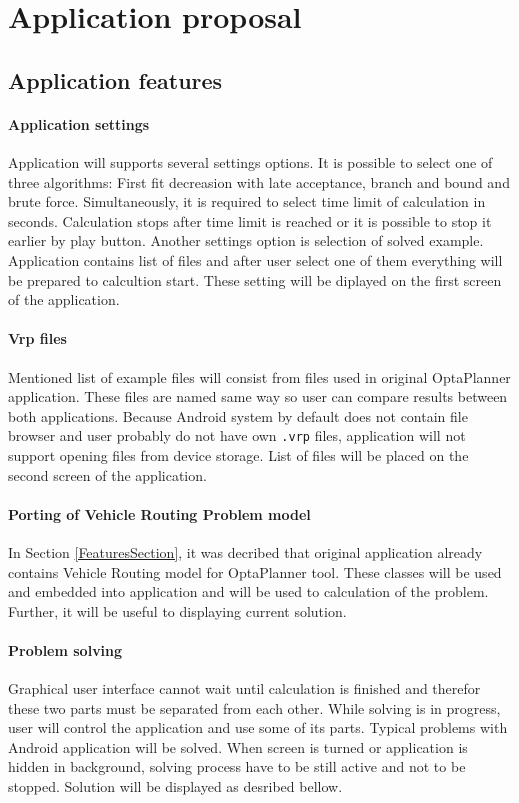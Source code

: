 \section{Application proposal}

\subsection{Application features}

\paragraph{Application settings}
Application will supports several settings options. It is possible to select one of three algorithms: First fit
decreasion with late acceptance, branch and bound and brute force. Simultaneously, it is required to select time limit
of calculation in seconds. Calculation stops after time limit is reached or it is possible to stop it earlier by play
button. Another settings option is selection of solved example. Application contains list of files and after user select
one of them everything will be prepared to calcultion start. These setting will be diplayed on the first screen of
the application.

\paragraph{Vrp files}
Mentioned list of example files will consist from files used in original OptaPlanner application. These files are named
same way so user can compare results between both applications. Because Android system by default does not contain file
browser and user probably do not have own \texttt{.vrp} files, application will not support opening files from device
storage. List of files will be placed on the second screen of the application.

\paragraph{Porting of Vehicle Routing Problem model}
In Section \ref{FeaturesSection}, it was decribed that original application already contains Vehicle Routing model for
OptaPlanner tool. These classes will be used and embedded into application and will be used to calculation of the
problem. Further, it will be useful to displaying current solution.

\paragraph{Problem solving}
Graphical user interface cannot wait until calculation is finished and therefor these two parts must be separated from
each other. While solving is in progress, user will control the application and use some of its parts. Typical problems
with Android application will be solved. When screen is turned or application is hidden in background, solving process
have to be still active and not to be stopped. Solution will be displayed as desribed bellow.

